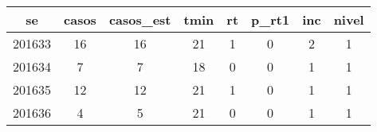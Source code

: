 \begin{tabular}{c|ccccccc}
  \hline
se & casos & casos\_est & tmin & rt & p\_rt1 & inc & nivel \\ 
  \hline
201633 & 16 & 16 & 21 & 1 & 0 & 2 & 1 \\ 
  201634 & 7 & 7 & 18 & 0 & 0 & 1 & 1 \\ 
  201635 & 12 & 12 & 21 & 1 & 0 & 1 & 1 \\ 
  201636 & 4 & 5 & 21 & 0 & 0 & 1 & 1 \\ 
   \hline
\end{tabular}
